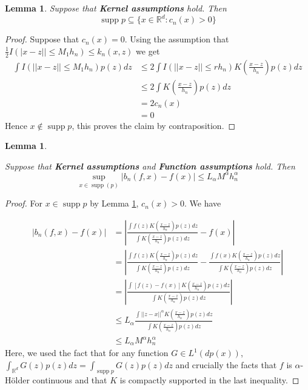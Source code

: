 \documentclass{article}
\newtheorem{lemma}[theorem]{Lemma}
\DeclareMathOperator\supp{supp}
\begin{document}
\begin{lemma}
\label{well_cond_lemma}
Suppose that \textbf{Kernel assumptions} hold. Then
\begin{equation*}
    \supp{p}\subseteq \{x\in\mathbb{R}^d:c_n(x)>0\}
\end{equation*}

\end{lemma}
\begin{proof}
Suppose that $c_n(x)=0$.
Using the assumption that $\frac{1}{2}I(|x-z||\leq M_1h_n)\leq k_n(x,z)$ we get 
\begin{equation*}
\begin{split}
    \int I(||x-z||\leq M_1h_n) p(z)dz &\leq 2\int I(||x-z||\leq rh_n)K(\frac{x-z}{h_n})p(z)dz\\
    &\leq 2\int K(\frac{x-z}{h_n})p(z)dz\\
    &=2c_n(x)\\
    &=0
\end{split}
\end{equation*}
Hence $x\notin\supp{p}$, this proves the claim by contraposition.
\end{proof}



\begin{lemma}
\label{bias_control_lemma}

Suppose that \textbf{Kernel assumptions} and \textbf{Function assumptions} hold. Then
    \begin{equation*}
    \sup_{x\in \supp(p)}|b_n(f,x)-f(x)|\leq L_{\alpha}M^{\alpha}h_n^{\alpha}
\end{equation*}
\end{lemma}

\begin{proof}
For $x\in\supp{p}$ by Lemma \ref{well_cond_lemma}, $c_n(x)>0$.
We have 

\begin{equation*}
\begin{split}
|b_n(f,x)-f(x)|&=|\frac{\int f(z)K(\frac{x-z}{h_n})p(z)dz}{\int K(\frac{x-z}{h_n})p(z)dz}-f(x)|\\
&=|\frac{\int f(z)K(\frac{x-z}{h_n})p(z)dz}{\int K(\frac{x-z}{h_n})p(z)dz}-\frac{\int f(x)K(\frac{x-z}{h_n})p(z)dz}{\int K(\frac{x-z}{h_n})p(z)dz}|\\
&=|\frac{\int[f(z)-f(x)]K(\frac{x-z}{h_n})p(z)dz
}{\int K(\frac{x-z}{h_n})p(z)dz}|\\
&\leq L_{\alpha}\frac{ \int 
||z-x||^{\alpha}K(\frac{x-z}{h_n})p(z)dz}{
\int K(\frac{x-z}{h_n})p(z)dz}\\
&\leq L_{\alpha}M^{\alpha}h_n^{\alpha}
\end{split}
\end{equation*}
Here, we used the fact that for any function $G\in L^1(dp(x))$, $\int_{\mathbb{R}^d} G(z)p(z)dz=\int_{\supp{p}} G(z)p(z)dz$ and crucially the facts that $f$ is $\alpha$-Hölder continuous and that $K$ is compactly supported in the last inequality.
\end{proof}
\end{document}
